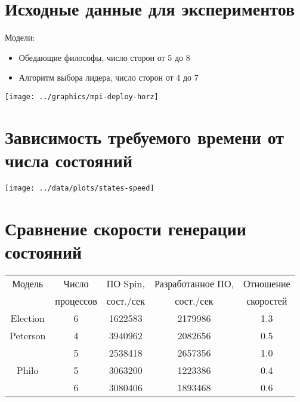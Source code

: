 \documentclass[12pt]{article}
\begin{document}
\section{Исходные данные для экспериментов}
\label{sec:experim-input}

\begin{minipage}[t]{0.15\linewidth}
Модели:  
\end{minipage}
\begin{minipage}[t]{0.85\linewidth}
  \begin{itemize}
  \item Обедающие философы, число сторон от 5 до 8
  \item Алгоритм выбора лидера, число сторон от 4 до 7
  \end{itemize}

\end{minipage}
\begin{center}
  \texttt{[image: ../graphics/mpi-deploy-horz]}
\end{center}

\section{Зависимость требуемого времени от числа состояний}
\label{sec:states-time}

\begin{center}
  \texttt{[image: ../data/plots/states-speed]}
\end{center}

\section{Сравнение скорости генерации состояний}
\label{sec:stategen-speed}

\begin{tabular}{ccccc}
  \hline
  Модель & Число     & ПО Spin,   & Разработанное ПО, & Отношение \\
  & процессов & сост./сек &  сост./сек         & скоростей \\
  \hline
  Election & 6 & 1622583 & 2179986 & 1.3 \\
  Peterson & 4 & 3940962 & 2082656 & 0.5 \\
   & 5 & 2538418 & 2657356 & 1.0 \\
  Philo & 5 & 3063200 & 1223386 & 0.4 \\
   & 6 & 3080406 & 1893468 & 0.6 \\
  \hline
\end{tabular}
\end{document}
